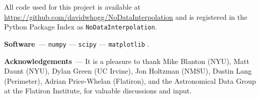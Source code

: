 \documentclass[modern]{aastex631}
\renewcommand{\paragraph}[1]{\medskip\par\noindent\textbf{#1}~---}
\begin{document}
All code used for this project is available at \url{https://github.com/davidwhogg/NoDataInterpolation} and is registered in the Python Package Index as \texttt{NoDataInterpolation}.

\paragraph{Software}
\texttt{numpy} \citep{numpy} ---
\texttt{scipy} \citep{scipy} ---
\texttt{matplotlib} \citep{matplotlib}.

\paragraph{Acknowledgements}
It is a pleasure to thank
Mike Blanton (NYU),
Matt Daunt (NYU),
Dylan Green (UC Irvine),
Jon Holtzman (NMSU), 
Dustin Lang (Perimeter),
Adrian Price-Whelan (Flatiron),
and the Astronomical Data Group at the Flatiron Institute,
for valuable discussions and input.
\end{document}
